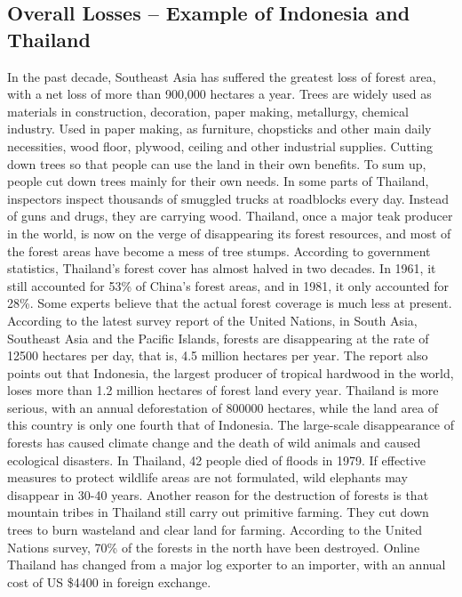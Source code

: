\documentclass{book}\usepackage{knitr}
\begin{document}
\begin{knitrout}
\begin{kframe}
{\section{Overall Losses – Example of Indonesia and Thailand}
In the past decade, Southeast Asia has suffered the greatest loss of forest area, with a net loss of more than 900,000 hectares a year. Trees are widely used as materials in construction, decoration, paper making, metallurgy, chemical industry. Used in paper making, as furniture, chopsticks and other main daily necessities, wood floor, plywood, ceiling and other industrial supplies. Cutting down trees so that people can use the land in their own benefits. To sum up, people cut down trees mainly for their own needs.
	In some parts of Thailand, inspectors inspect thousands of smuggled trucks at roadblocks every day. Instead of guns and drugs, they are carrying wood. Thailand, once a major teak producer in the world, is now on the verge of disappearing its forest resources, and most of the forest areas have become a mess of tree stumps. According to government statistics, Thailand's forest cover has almost halved in two decades. In 1961, it still accounted for 53\% of China's forest areas, and in 1981, it only accounted for 28\%. Some experts believe that the actual forest coverage is much less at present. According to the latest survey report of the United Nations, in South Asia, Southeast Asia and the Pacific Islands, forests are disappearing at the rate of 12500 hectares per day, that is, 4.5 million hectares per year. The report also points out that Indonesia, the largest producer of tropical hardwood in the world, loses more than 1.2 million hectares of forest land every year. Thailand is more serious, with an annual deforestation of 800000 hectares, while the land area of this country is only one fourth that of Indonesia. The large-scale disappearance of forests has caused climate change and the death of wild animals and caused ecological disasters. In Thailand, 42 people died of floods in 1979. If effective measures to protect wildlife areas are not formulated, wild elephants may disappear in 30-40 years. Another reason for the destruction of forests is that mountain tribes in Thailand still carry out primitive farming. They cut down trees to burn wasteland and clear land for farming. According to the United Nations survey, 70\% of the forests in the north have been destroyed. Online Thailand has changed from a major log exporter to an importer, with an annual cost of US \$4400 in foreign exchange.
}
\end{kframe}
\end{knitrout}
\end{document}
